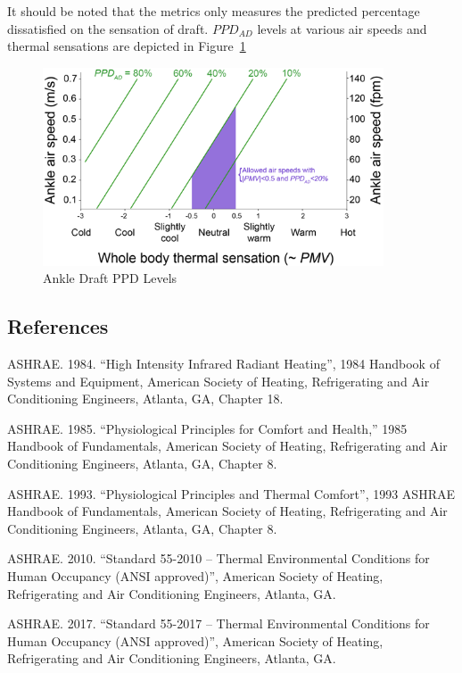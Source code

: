 It should be noted that the metrics only measures the predicted percentage dissatisfied on the sensation of draft. \(PPD_{AD}\) levels at various air speeds and thermal sensations are depicted in Figure~\ref{fig:ankle-draft-ppd}

\begin{figure}[hbtp]
\centering
\includegraphics[width=0.9\textwidth, height=0.9\textheight, keepaspectratio=true]{media/ankle_draft.png}
\caption{Ankle Draft PPD Levels \protect \label{fig:ankle-draft-ppd}}
\end{figure}

\subsection{References}\label{references-1-012}

ASHRAE. 1984. ``High Intensity Infrared Radiant Heating'', 1984 Handbook of Systems and Equipment, American Society of Heating, Refrigerating and Air Conditioning Engineers, Atlanta, GA, Chapter 18.

ASHRAE. 1985. ``Physiological Principles for Comfort and Health,'' 1985 Handbook of Fundamentals, American Society of Heating, Refrigerating and Air Conditioning Engineers, Atlanta, GA, Chapter 8.

ASHRAE. 1993. ``Physiological Principles and Thermal Comfort'', 1993 ASHRAE Handbook of Fundamentals, American Society of Heating, Refrigerating and Air Conditioning Engineers, Atlanta, GA, Chapter 8.

ASHRAE. 2010. ``Standard 55-2010 -- Thermal Environmental Conditions for Human Occupancy (ANSI approved)'', American Society of Heating, Refrigerating and Air Conditioning Engineers, Atlanta, GA.

ASHRAE. 2017. ``Standard 55-2017 -- Thermal Environmental Conditions for Human Occupancy (ANSI approved)'', American Society of Heating, Refrigerating and Air Conditioning Engineers, Atlanta, GA.


